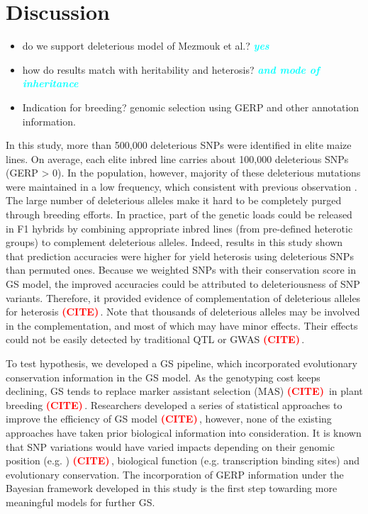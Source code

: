 \documentclass[9pt,twocolumn,twoside]{gsajnl}
\newcommand{\yang}[1]{\textcolor{cyan}{\emph{\bf  #1}} }
\newcommand{\citex}{\textcolor{red}{\bf (CITE)\,}}
\begin{document}
\section*{Discussion}

\begin{itemize}
  \item do we support deleterious model of Mezmouk et al.? \yang{yes}
  \item how do results match with heritability and heterosis? \yang{and mode of inheritance}
  \item Indication for breeding? genomic selection using GERP and other annotation information. 
\end{itemize}


In this study, more than 500,000 deleterious SNPs were identified in elite maize lines. On average, each elite inbred line carries about 100,000 deleterious SNPs (GERP > 0). In the population, however, majority of these deleterious mutations were maintained in a low frequency, which consistent with previous observation \citep{rodgers2015recombination}. The large number of deleterious alleles make it hard to be completely purged through breeding efforts. In practice, part of the genetic loads could be released in F1 hybrids by combining appropriate inbred lines (from pre-defined heterotic groups) to complement deleterious alleles. Indeed, results in this study shown that prediction accuracies were higher for yield heterosis using deleterious SNPs than permuted ones. Because we weighted SNPs with their conservation score in GS model, the improved accuracies could be attributed to deleteriousness of SNP variants. Therefore, it provided evidence of complementation of deleterious alleles for heterosis \citex{}. Note that thousands of deleterious alleles may be involved in the complementation, and most of which may have minor effects. Their effects could not be easily detected by traditional QTL or GWAS \citex{}.

To test hypothesis, we developed a GS pipeline, which incorporated evolutionary conservation information in the GS model. As the genotyping cost keeps declining, GS tends to replace marker assistant selection (MAS) \citex{} in plant breeding \citex{}. Researchers developed a series of statistical approaches to improve the efficiency of GS model \citex{}, however, none of the existing approaches have taken prior biological information into consideration. It is known that SNP variations would have varied impacts depending on their genomic position (e.g. ) \citex{}, biological function (e.g. transcription binding sites) and evolutionary conservation. The incorporation of GERP information under the Bayesian framework developed in this study is the first step towarding more meaningful models for further GS.     
\end{document}
